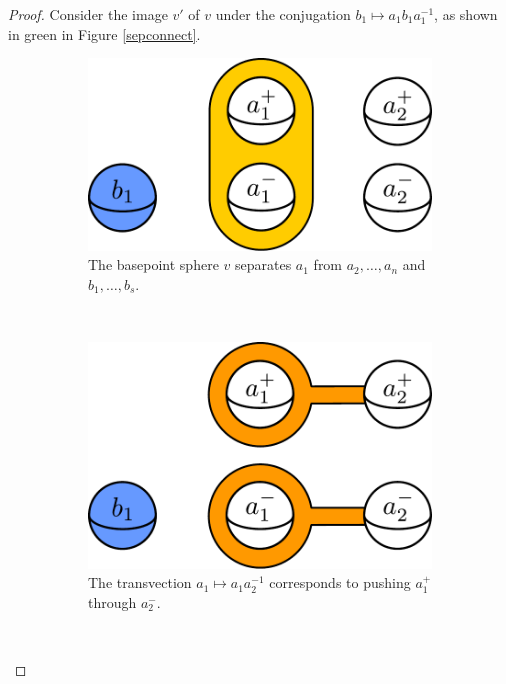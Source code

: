 \begin{proof}
Consider the image $v'$ of $v$ under the
conjugation $b_1 \mapsto a_1b_1a_1^{-1}$,
as shown in green in Figure \ref{sepconnect}.

\begin{figure}[b!]
    \centering
    \begin{subfigure}[t]{0.3\textwidth}
        \includegraphics[width=\textwidth]{figures/sepconnect0.pdf}
        \caption{The basepoint sphere $v$ separates $a_1$
        from $a_2,\ldots, a_n$ and $b_1, \ldots, b_s$.}
        \label{fig:sepconnect0}
    \end{subfigure}
    ~
    \begin{subfigure}[t]{0.3\textwidth}
        \includegraphics[width=\textwidth]{figures/sepconnect1.pdf}
        \caption{The transvection $a_1 \mapsto a_1a_2^{-1}$
        corresponds to
        pushing $a_1^+$ through $a_2^-$.}
        \label{fig:sepconnect1}
    \end{subfigure}
    ~
    \begin{subfigure}[t]{0.3\textwidth}

\end{subfigure}
\end{figure}
\end{proof}
